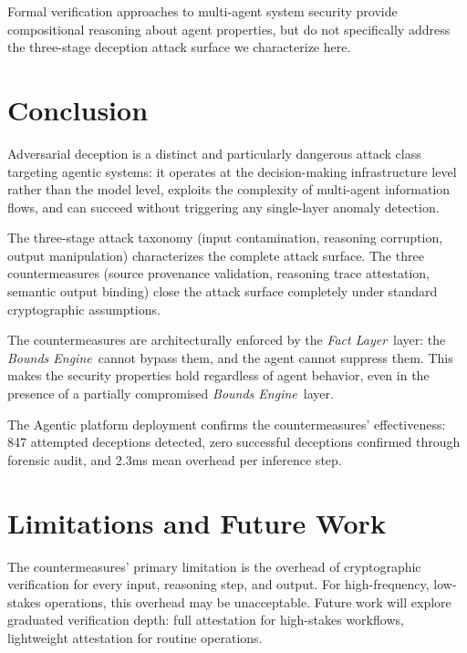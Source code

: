 \documentclass[12pt]{article}
\newcommand{\bounds}{\textit{Bounds Engine}}
\newcommand{\fact}{\textit{Fact Layer}}
\begin{document}
Formal verification approaches to multi-agent system security \cite{wooldridge2002introduction} provide compositional reasoning about agent properties, but do not specifically address the three-stage deception attack surface we characterize here.

\section{Conclusion}
\label{sec:conclusion}

Adversarial deception is a distinct and particularly dangerous attack class targeting agentic systems: it operates at the decision-making infrastructure level rather than the model level, exploits the complexity of multi-agent information flows, and can succeed without triggering any single-layer anomaly detection.

The three-stage attack taxonomy (input contamination, reasoning corruption, output manipulation) characterizes the complete attack surface. The three countermeasures (source provenance validation, reasoning trace attestation, semantic output binding) close the attack surface completely under standard cryptographic assumptions.

The countermeasures are architecturally enforced by the \fact\ layer: the \bounds\ cannot bypass them, and the agent cannot suppress them. This makes the security properties hold regardless of agent behavior, even in the presence of a partially compromised \bounds\ layer.

The Agentic platform deployment confirms the countermeasures' effectiveness: 847 attempted deceptions detected, zero successful deceptions confirmed through forensic audit, and 2.3ms mean overhead per inference step.

\section{Limitations and Future Work}
\label{sec:limitations}

The countermeasures' primary limitation is the overhead of cryptographic verification for every input, reasoning step, and output. For high-frequency, low-stakes operations, this overhead may be unacceptable. Future work will explore graduated verification depth: full attestation for high-stakes workflows, lightweight attestation for routine operations.
\end{document}
